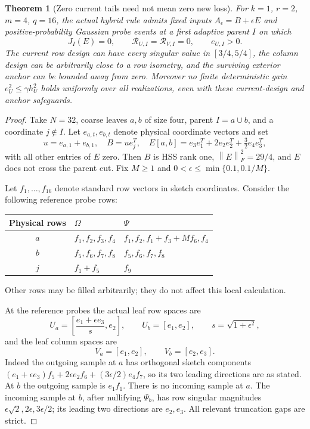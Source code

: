 \documentclass[11pt,oneside,openany,a4paper]{book}
\numberwithin{equation}{chapter}
\newtheorem{theorem}{Theorem}[chapter]
\theoremstyle{definition}
\theoremstyle{remark}
\newcommand{\F}[1]{\left\lVert#1\right\rVert_F}
\begin{document}
\begin{theorem}[Zero current tails need not mean zero new loss]\label{return:thm:example}
For $k=1$, $r=2$, $m=4$, $q=16$, the actual hybrid rule admits fixed inputs $A_\epsilon=B+\epsilon E$ and positive-probability Gaussian probe events at a first adaptive parent $I$ on which
\[
 J_I(E)=0,\qquad \mathcal R_{U,I}=\mathcal R_{V,I}=0,
 \qquad e_{U,I}>0.
\]
The current row design can have every singular value in $[3/4,5/4]$, the column design can be arbitrarily close to a row isometry, and the surviving exterior anchor can be bounded away from zero. Moreover no finite deterministic gain $e_U^2\le\gamma h_U^2$ holds uniformly over all realizations, even with these current-design and anchor safeguards.
\end{theorem}
\begin{proof}
Take $N=32$, coarse leaves $a,b$ of size four, parent $I=a\cup b$, and a coordinate $j\notin I$. Let $e_{a,t},e_{b,t}$ denote physical coordinate vectors and set
\[
 u=e_{a,1}+e_{b,1},\quad B=ue_j^T,\quad
 E[a,b]=e_3e_1^T+2e_2e_2^T+\tfrac32e_4e_3^T,
\]
with all other entries of $E$ zero. Then $B$ is HSS rank one, $\F E^2=29/4$, and $E$ does not cross the parent cut. Fix $M\ge1$ and
$0<\epsilon\le\min\{0.1,0.1/M\}$.

Let $f_1,\ldots,f_{16}$ denote standard row vectors in sketch coordinates. Consider the following reference probe rows:
\begin{center}
\begin{tabular}{@{}cll@{}}\toprule
Physical rows & $\Omega$ & $\Psi$\\\midrule
$a$ & $f_1,f_2,f_3,f_4$ & $f_1,f_2,f_1+f_3+Mf_6,f_4$\\
$b$ & $f_5,f_6,f_7,f_8$ & $f_5,f_6,f_7,f_8$\\
$j$ & $f_1+f_5$ & $f_9$\\\bottomrule
\end{tabular}
\end{center}
Other rows may be filled arbitrarily; they do not affect this local calculation.

At the reference probes the actual leaf row spaces are
\[
 U_a=\left[\frac{e_1+\epsilon e_3}{s},e_2\right],\qquad
 U_b=[e_1,e_2],\qquad s=\sqrt{1+\epsilon^2},
\]
and the leaf column spaces are
\[
 V_a=[e_1,e_2],\qquad V_b=[e_2,e_3].
\]
Indeed the outgoing sample at $a$ has orthogonal sketch components
$(e_1+\epsilon e_3)f_5+2\epsilon e_2f_6+(3\epsilon/2)e_4f_7$, so its two leading directions are as stated. At $b$ the outgoing sample is $e_1f_1$. There is no incoming sample at $a$. The incoming sample at $b$, after nullifying $\Psi_b$, has row singular magnitudes $\epsilon\sqrt2,2\epsilon,3\epsilon/2$; its leading two directions are $e_2,e_3$. All relevant truncation gaps are strict.


\end{proof}
\end{document}
